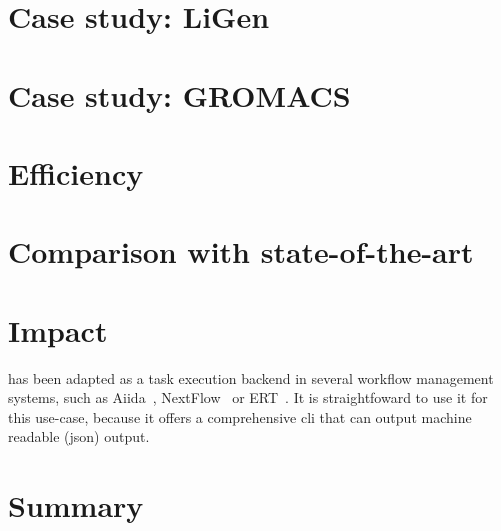 \section{Case study: LiGen}

\section{Case study: GROMACS}

\section{Efficiency}

\section{Comparison with state-of-the-art}

\section{Impact}
\hyperqueue{} has been adapted as a task execution backend in several workflow management
systems, such as Aiida~\cite{aiida-hq}, NextFlow~\cite{nextflow-hq} or ERT~\cite{ert}. It is
straightfoward to use it for this use-case, because it offers a comprehensive \gls{cli} that can output machine readable
(\gls{json}) output.


\section{Summary}
